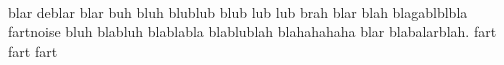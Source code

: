 \paragraph{} blar deblar blar buh bluh blublub blub lub lub brah blar blah blagablblbla fartnoise 
  bluh blabluh blablabla blablublah blahahahaha blar blabalarblah.
  fart fart fart
